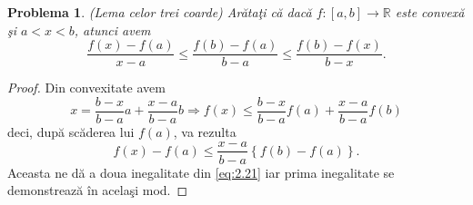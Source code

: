 \documentclass[a4paper,12pt,oneside]{report}
\newtheorem{problem}{Problema}
\begin{document}
\begin{problem} (Lema celor trei coarde)
Ar\u{a}ta\c{t}i c\u{a} dac\u{a} \(f : \left [ a,b \right ]  \to \mathbb{R}\) este convex\u{a} \c{s}i \(a <  x < b\), atunci avem
\begin{displaymath}
    \frac{f\left ( x \right ) - f\left ( a \right )}{x - a} \leq \frac{f\left ( b \right ) - f\left ( a \right )}{b - a} \leq  \frac{f\left ( b \right ) - f\left ( x \right )}{b - x}.   \label{eq:2.21}\tag{2.21}
\end{displaymath}
\end{problem}
\begin{proof}
Din convexitate avem
\begin{displaymath}
    x = \frac{b - x}{b - a}a + \frac{x - a}{b - a }b \Rightarrow f\left ( x \right ) \leq \frac{b - x}{b - a}f\left ( a \right ) + \frac{x - a}{b - a }f\left ( b \right )
\end{displaymath}
 deci, dup\u{a} sc\u{a}derea lui \(f\left ( a \right )\), va rezulta
 \begin{displaymath}
     f\left ( x \right ) - f\left ( a \right )\leq \frac{x - a}{b - a }\left \{ f\left ( b \right ) - f\left ( a \right ) \right \}. \label{eq:2.22} \tag{2.22}
 \end{displaymath}
Aceasta ne d\u{a} a doua inegalitate din \ref{eq:2.21} iar prima inegalitate se demonstreaz\u{a} \^{i}n acela\c{s}i mod.
\end{proof}









\setlength{\baselineskip}{\normalbaselineskip}
\setlength{\parskip}{0pt}

\end{document}
